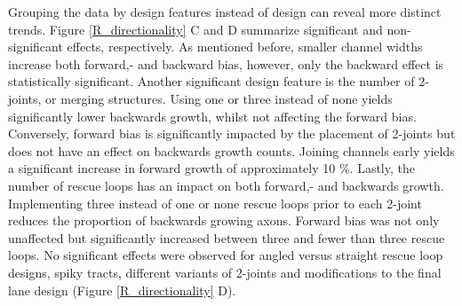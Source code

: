 Grouping the data by design features instead of design can reveal more distinct
trends. Figure \ref{R_directionality} C and D summarize significant and
non-significant effects, respectively. As mentioned before, smaller channel
widths increase both forward,- and backward bias, however, only the backward
effect is statistically significant. Another significant design feature is the
number of 2-joints, or merging structures. Using one or three instead of none
yields significantly lower backwards growth, whilst not affecting the forward
bias. Conversely, forward bias is significantly impacted by the placement of
2-joints but does not have an effect on backwards growth counts. Joining
channels early yields a significant increase in forward growth of approximately
10 \%. Lastly, the number of rescue loops has an impact on both forward,- and
backwards growth. Implementing three instead of one or none rescue loops prior
to each 2-joint reduces the proportion of backwards growing axons. Forward bias
was not only unaffected but significantly increased between three and fewer than
three rescue loops. No significant effects were observed for angled versus
straight rescue loop designs, spiky tracts, different variants of 2-joints and
modifications to the final lane design (Figure \ref{R_directionality} D). \\

